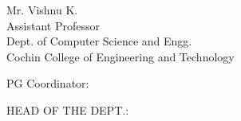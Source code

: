 \begin{doulespace}
\noindent
\begin{minipage}[t]{0.65\linewidth}
\begin{flushleft}
\begin{singlespace}
Mr. Vishnu K.\\
Assistant Professor\\
Dept. of Computer Science and Engg.\\
Cochin College of Engineering and Technology\\
\end{singlespace}
 \end{flushleft}
 \end{minipage}
\hfill
\noindent
\begin{minipage}[t]{0.7\linewidth}
\begin{flushleft}
\end{flushleft}
\end{minipage}

\vspace{.5cm}
\noindent
\begin{minipage}[t]{0.7\linewidth}
 \begin{flushleft}
PG Coordinator:
 \end{flushleft}
 \end{minipage}
\hfill
\noindent
 \begin{minipage}[t]{0.5\linewidth}
\begin{flushleft}
HEAD OF THE DEPT.:\\
\end{flushleft}
\end{minipage}




\end{doulespace}
